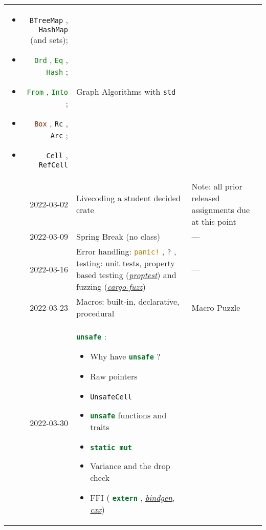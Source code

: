 \documentclass{article}
\newcommand{\code}[2][]{{\sloppy
\ifmmode
\text{\lstinline[language=rust,#1]`#2`}
\else
{\lstinline[language=rust,#1]`#2`}%
\fi}}
\begin{document}
\begin{longtable}{rp{}@{\hskip .05\textwidth}p{}}
\begin{itemize}
                        \item \code{BTreeMap}, \code{HashMap} (and sets);
                        \item \code{Ord}, \code{Eq}, \code{Hash};
                        \item \code{From}, \code{Into};
                        \item \code{Box}, \code{Rc}, \code{Arc};
                        \item \code{Cell}, \code{RefCell}
                    \end{itemize}
                & Graph Algorithms with \code{std}                          \\
    2022-03-02  & Livecoding a student decided crate
                & Note: all prior released assignments due at this point    \\
    2022-03-09  & Spring Break (no class)
                & ---                                                       \\
    2022-03-16  & Error handling: \code{panic!}, \code{?}, testing: unit tests,
                  property based testing
                  (\href{https://github.com/AltSysrq/proptest}{\textit{proptest}})
                  and fuzzing
                  (\href{https://github.com/rust-fuzz/cargo-fuzz}{\textit{cargo-fuzz}})
                & ---                                                       \\
    2022-03-23  & Macros: built-in, declarative, procedural
                & Macro Puzzle                                              \\
    2022-03-30  & \code{unsafe}: \begin{itemize}
                        \item Why have \code{unsafe}?
                        \item Raw pointers
                        \item \code{UnsafeCell}
                        \item \code{unsafe} functions and traits
                        \item \code{static mut}
                        \item Variance and the drop check
                        \item FFI (\code{extern},
                            \href{https://github.com/rust-lang/rust-bindgen}{\textit{bindgen}},
                            \href{https://github.com/dtolnay/cxx}{\textit{cxx}})
                    \end{itemize}

\end{longtable}
\end{document}
